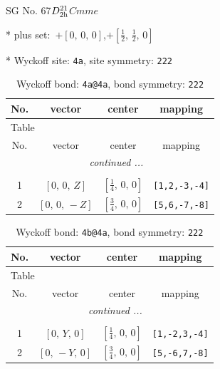 \documentclass[fleqn,8pt]{jsarticle}
\begin{document}
\setcounter{MaxMatrixCols}{32}

\renewcommand{\tablename}{Table~}
\renewcommand{\figurename}{Figure~}
\begin{center}
\LARGE
SG No. 67\quad$D_{\rm 2h}^{21}$\quad$Cmme$\quad[ orthorhombic ]
\end{center}

* plus set:\,\,\,$+\left[ 0,\, 0,\, 0 \right]$,\quad $+\left[ \frac{1}{2},\, \frac{1}{2},\, 0 \right]$


* Wyckoff site: {\tt 4a}, site symmetry: {\tt 222}
\renewcommand{\arraystretch}{1.2}
\begin{longtable}{cccc}
\caption{Wyckoff bond: {\tt 4a@4a}, bond symmetry: {\tt 222}}
 \\
 \hline \hline
No. & vector & center & mapping \\ \hline \endfirsthead

\multicolumn{3}{l}{\tablename\ \thetable{}} \\
 \hline \hline
No. & vector & center & mapping \\ \hline \endhead

 \hline \hline
\multicolumn{3}{r}{\footnotesize\it continued ...} \\ \endfoot

 \hline \hline
\multicolumn{3}{r}{} \\ \endlastfoot

1 & $\left[ 0,\, 0,\, Z \right]$ & $\left[ \frac{1}{4},\, 0,\, 0 \right]$ & {\tt [1,2,-3,-4]} \\ \hline
2 & $\left[ 0,\, 0,\, - Z \right]$ & $\left[ \frac{3}{4},\, 0,\, 0 \right]$ & {\tt [5,6,-7,-8]} \\
\end{longtable}
\renewcommand{\arraystretch}{1.2}
\begin{longtable}{cccc}
\caption{Wyckoff bond: {\tt 4b@4a}, bond symmetry: {\tt 222}}
 \\
 \hline \hline
No. & vector & center & mapping \\ \hline \endfirsthead

\multicolumn{3}{l}{\tablename\ \thetable{}} \\
 \hline \hline
No. & vector & center & mapping \\ \hline \endhead

 \hline \hline
\multicolumn{3}{r}{\footnotesize\it continued ...} \\ \endfoot

 \hline \hline
\multicolumn{3}{r}{} \\ \endlastfoot

1 & $\left[ 0,\, Y,\, 0 \right]$ & $\left[ \frac{1}{4},\, 0,\, 0 \right]$ & {\tt [1,-2,3,-4]} \\ \hline
2 & $\left[ 0,\, - Y,\, 0 \right]$ & $\left[ \frac{3}{4},\, 0,\, 0 \right]$ & {\tt [5,-6,7,-8]} \\
\end{longtable}
\end{document}
